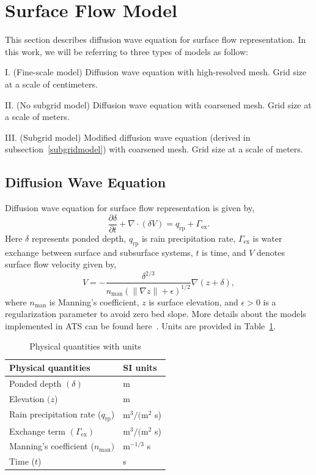\documentclass[review,11pt]{elsarticle}
\begin{document}
\section{Surface Flow Model}
This section describes diffusion wave equation for surface flow representation. In this work, we will be referring to three types of models as follow:
\begin{description}\itemsep0pt \parskip0pt
\item I. (Fine-scale model) Diffusion wave equation with high-resolved mesh. Grid size at a scale of centimeters.
\item II. (No subgrid model) Diffusion wave equation with coarsened mesh. Grid size at a scale of meters.
\item III. (Subgrid model) Modified diffusion wave equation (derived in subsection~\ref{subgridmodel}) with coarsened mesh. Grid size at a scale of meters.
\end{description}

\subsection{Diffusion Wave Equation}
Diffusion wave equation for surface flow representation is given by,
\begin{equation}\label{diffwaveeq}
\frac{\partial \delta}{\partial t} + \nabla \cdot (\delta V)= q_\text{rp} + \Gamma_\text{ex}.
\end{equation}
Here $\delta$ represents ponded depth, $q_\text{rp}$ is rain precipitation rate, $\Gamma_\text{ex}$ is water exchange between surface and subsurface systems, $t$ is time, and $V$ denotes surface flow velocity given by,
\begin{equation}
V = - \frac{\delta^{2/3}}{n_\text{man} (\| \nabla z\| +\epsilon)^{1/2}} \nabla(z + \delta),
\end{equation}
where $n_\text{man}$ is Manning's coefficient, $z$ is surface elevation, and $\epsilon >0$ is a regularization parameter to avoid zero bed slope. More details about the models implemented in ATS can be found here~\cite{spainter2016integrated}. Units are provided in Table~\ref{table1}.
\begin{center}
\begin{table}[htbp]
\caption{Physical quantities with units}
\begin{tabular}{| l | l |}
\hline
Physical quantities & SI units \\ \hline
Ponded depth $(\delta)$ & m \\
Elevation $(z$) & m \\
Rain precipitation rate ($q_\text{rp}$) & m$^3/($m$^2$ s) \\
Exchange term $(\Gamma_\text{ex})$& m$^3/($m$^2$ s) \\
Manning's coefficient ($n_\text{man}) $ & m$^{-1/3}$ s \\
Time ($t$) & s \\
\hline

\end{tabular}
\label{table1}
\end{table}
\end{center}
\end{document}
